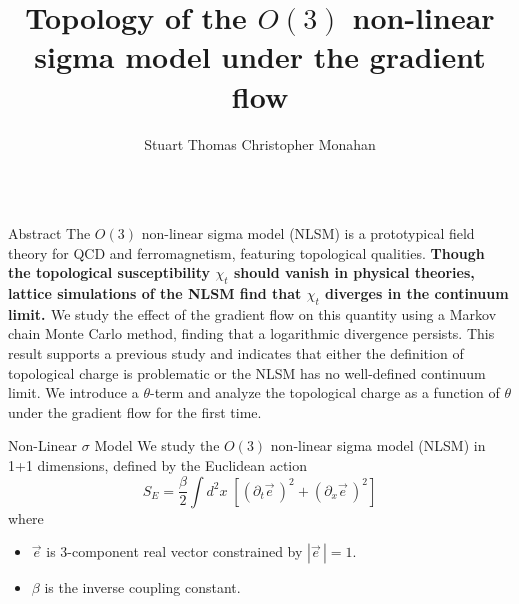 \documentclass[18pt]{beamer}
\title{Topology of the $O(3)$ non-linear sigma model under the gradient flow}
\author{Stuart Thomas\inst{1} \quad Christopher Monahan\inst{1,2}}
\institute{\inst{1} William \& Mary \quad \inst{2}Jefferson Lab}
\newcommand{\e}{\vec e}
\begin{document}
\begin{frame}{}
  \begin{columns}[t]

    \begin{column}{0.32\linewidth}
        \begin{block}{Abstract}
            The $O(3)$ non-linear sigma model (NLSM) is a prototypical field theory for QCD and ferromagnetism, featuring topological qualities. {\bf Though the topological susceptibility $\chi_t$  should vanish in physical theories, lattice simulations of the NLSM find that $\chi_t$ diverges in the continuum limit. \cite{bietenholz2018, berg1981}} We study the effect of the gradient flow on this quantity using a Markov chain Monte Carlo method, finding that a logarithmic divergence persists. This result supports a previous study and indicates that either the definition of topological charge is problematic or the NLSM has no well-defined continuum limit. We introduce a $\theta$-term and analyze the topological charge as a function of $\theta$ under the gradient flow for the first time.
        \end{block}
        \begin{block}{Non-Linear $\sigma$ Model}
            We study the $O(3)$ non-linear sigma model (NLSM) in 1+1 dimensions, defined by the Euclidean action
            \begin{equation*}
                \label{eq:nlsm euclidean action}
                S_E = \frac{\beta}{2} \int d^2x \; \left[ \left(\partial_t \e\, \right)^2+ \left( \partial_x \e\,\right)^2 \right]
            \end{equation*}
        where
        \begin{itemize}
            \item $\e$ is 3-component real vector constrained by $|\e\,|=1$.
            \item $\beta$ is the inverse coupling constant.
        \end{itemize}


\end{block}
\end{column}
\end{columns}
\end{frame}
\end{document}
